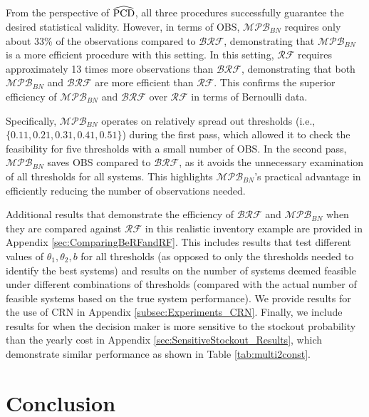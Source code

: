 \documentclass[11pt]{article}
\begin{document}
From the perspective of $\widehat{{\rm PCD}}$, all three procedures successfully guarantee the desired statistical validity. However, in terms of OBS, $\mathcal{MPB}_{BN}$ requires only about 33\% of the observations compared to $\mathcal{BRF}$, demonstrating that $\mathcal{MPB}_{BN}$ is a more efficient procedure with this setting. 
In this setting, $\mathcal{RF}$ requires approximately 13 times more observations than $\mathcal{BRF}$, demonstrating that both $\mathcal{MPB}_{BN}$ and $\mathcal{BRF}$ are more efficient than $\mathcal{RF}$. This confirms the superior efficiency of $\mathcal{MPB}_{BN}$ and $\mathcal{BRF}$ over $\mathcal{RF}$ in terms of Bernoulli data.

Specifically, $\mathcal{MPB}_{BN}$ operates on relatively spread out thresholds (i.e., $\{0.11, 0.21, 0.31, 0.41,0.51\}$) during the first pass, which allowed it to check the feasibility for five thresholds with a small number of OBS. In the second pass, $\mathcal{MPB}_{BN}$ saves OBS compared to $\mathcal{BRF}$, as it avoids the unnecessary examination of all thresholds for all systems. This highlights $\mathcal{MPB}_{BN}$’s practical advantage in efficiently reducing the number of observations needed. %

Additional results that demonstrate the efficiency of $\mathcal{BRF}$ and $\mathcal{MPB}_{BN}$ when they are compared against $\mathcal{RF}$ in this realistic inventory example are provided in Appendix \ref{sec:ComparingBeRFandRF}. This includes results that test different values of $\theta_1,\theta_2, b$ for all thresholds (as opposed to only the thresholds needed to identify the best systems) and results on the number of systems deemed feasible under different combinations of thresholds (compared with the actual number of feasible systems based on the true system performance). We provide results for the use of CRN in Appendix \ref{subsec:Experiments_CRN}. Finally, we include results for when the decision maker is more sensitive to the stockout probability than the yearly cost in Appendix \ref{sec:SensitiveStockout_Results}, which demonstrate similar performance as shown in Table \ref{tab:multi2const}.

\section{Conclusion}
\label{sec:conclusion}
\end{document}
